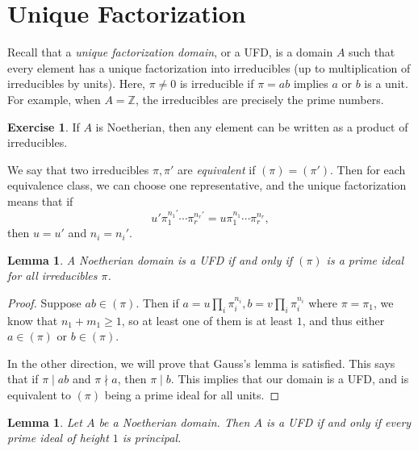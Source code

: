 \documentclass[leqno, openany]{memoir}
\newtheorem{lem}[thm]{Lemma}
\theoremstyle{definition}
\newtheorem{exer}[thm]{Exercise}
\theoremstyle{remark}
\theoremstyle{plain}
\theoremstyle{definition}
\theoremstyle{remark}
\newcommand{\Z}{\mathbb{Z}}
\begin{document}
\section{Unique Factorization}%

Recall that a \textit{unique factorization domain}, or a UFD, is a domain $A$
such that every element has a unique factorization into irreducibles (up to
multiplication of irreducibles by units). Here, $\pi \neq 0$ is irreducible if
$\pi = ab$ implies $a$ or $b$ is a unit. For example, when $A = \Z$, the
irreducibles are precisely the prime numbers.

\begin{exer} If $A$ is Noetherian, then any element can be written as a product
of irreducibles.  \end{exer}

We say that two irreducibles $\pi, \pi'$ are \textit{equivalent} if $(\pi) =
(\pi')$. Then for each equivalence class, we can choose one representative, and
the unique factorization means that if \[ u' \pi_1^{n_1'} \cdots \pi_r^{n_r'} =
u \pi_1^{n_1} \cdots \pi_r^{n_r}, \] then $u = u'$ and $n_i = n_i'$.

\begin{lem} A Noetherian domain is a UFD if and only if $(\pi)$ is a prime
ideal for all irreducibles $\pi$.  \end{lem}

\begin{proof} Suppose $ab \in (\pi)$. Then if $a = u \prod_i \pi_i^{n_i}, b = v
    \prod_i \pi_i^{n_i}$ where $\pi = \pi_1$, we know that $n_1 + m_1 \geq 1$,
    so at least one of them is at least $1$, and thus either $a \in (\pi)$ or
    $b \in (\pi)$.

    In the other direction, we will prove that Gauss's lemma is satisfied. This
says that if $\pi \mid ab$ and $\pi \nmid a$, then $\pi \mid b$. This implies
that our domain is a UFD, and is equivalent to $(\pi)$ being a prime ideal for
all units.  \end{proof}

\begin{lem} Let $A$ be a Noetherian domain. Then $A$ is a UFD if and only if
every prime ideal of height $1$ is principal.  \end{lem}
\end{document}

